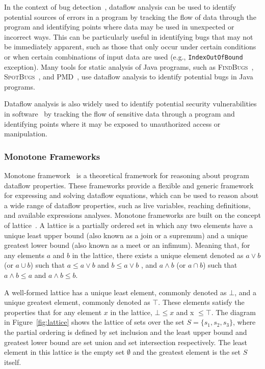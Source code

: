 In the context of bug detection~\cite{spoon, fink2012wala}, dataflow analysis can be used to identify
potential sources of errors in a program by tracking the flow of data through
the program and identifying points where data may be used in unexpected or
incorrect ways. This can be particularly useful in identifying bugs that may
not be immediately apparent, such as those that only occur under certain
conditions or when certain combinations of input data are used (e.g., \texttt{IndexOutOfBound} exception).
Many tools for static analysis of Java programs, such as \textsc{FindBugs}~\cite{findbugs},
\textsc{SpotBugs}~\cite{spotbugs}, and \textsc{PMD}~\cite{copeland2005pmd}, use dataflow analysis to identify
potential bugs in Java programs.

Dataflow analysis is also widely used to identify potential security vulnerabilities
in software~\cite{flowDroid,piskachev2021secucheck,lawall10coccinelle}
by tracking the flow of sensitive data through a program and
identifying points where it may be exposed to unauthorized access or manipulation.


\subsubsection*{Monotone Frameworks}
\label{sec:monotoneframeworks}
Monotone framework~\cite{kam1977monotone} is a theoretical framework for reasoning
about program dataflow properties.
These frameworks provide a flexible and generic framework for expressing and solving
dataflow equations, which can be used to reason about a wide range of dataflow
properties, such as live variables, reaching definitions, and available expressions analyses.
Monotone frameworks are built on the concept of lattice~\cite{Donnellan1968,Birkhoff1967,cousot1977ai}.
A lattice is a partially ordered set in which any two elements have a unique least
upper bound (also known as a join or a supremum) and a unique greatest lower bound
(also known as a meet or an infimum). Meaning that, for any elements $a$ and $b$ in
the lattice, there exists a unique element denoted as  $a \vee b$  (or  $a \cup b$)
such that  $a \leq a \vee b$  and  $ b \leq a \vee b$ , and  $a \wedge b$
(or  $ a\cap b$) such that  $ a\wedge b\leq a$  and  $a \wedge b\leq b$.

A well-formed lattice has a unique least element, commonly denoted as $\bot$,
and a unique greatest element, commonly denoted as $\top$. These elements satisfy
the properties that for any element $x$ in the lattice, $\bot \leq x$ and x $\leq \top$.
The diagram in Figure~\ref{fig:lattice} shows the lattice of sets over the set
$S = \{s_1, s_2, s_3\}$, where the partial ordering is defined by set inclusion
and the least upper bound and greatest lower bound are set union and set intersection
respectively. The least element in this lattice is the empty set $\emptyset$ and the
greatest element is the set $S$ itself.

